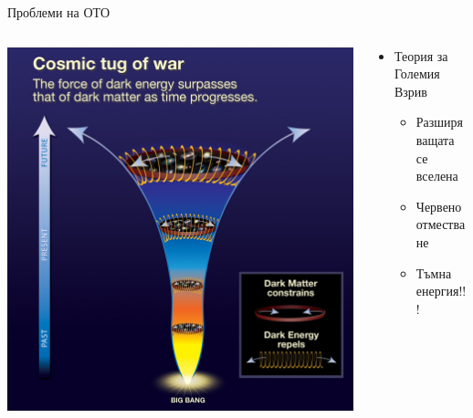 \documentclass[10pt,a4paper]{beamer}
\begin{document}
        \begin{frame}{ Проблеми на ОТО }
            \begin{columns}
                \begin{column}{0.5\textwidth}
                    \includegraphics[width=\textwidth]{images/big_bang_acc_expansion.jpg}
                \end{column}
                \begin{column}{0.5\textwidth}
                    \begin{itemize}
                        \item Теория за Големия Взрив \begin{itemize}
                            \item Разширяващата се вселена
                            \item Червено отместване
                            \item Тъмна енергия!!!
                        \end{itemize}
                    \end{itemize}
                \end{column}
            \end{columns}
        \end{frame}
        
\end{document}
